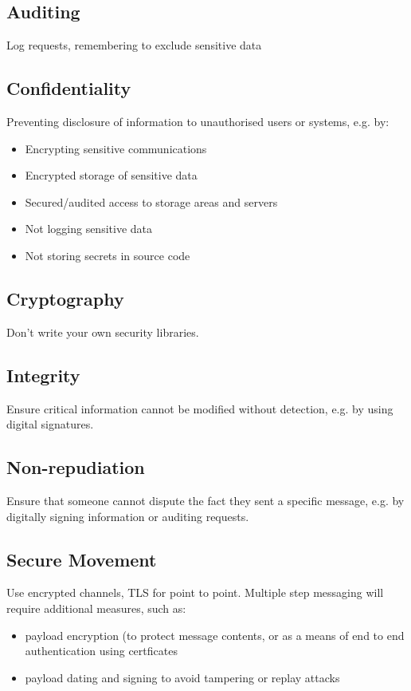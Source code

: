 \documentclass[a5paper,pagesize,10pt,bibtotoc,DIV=10,twoside]{scrbook}
\begin{document}
\subsection{Auditing}

Log requests, remembering to exclude sensitive data

\subsection{Confidentiality}
Preventing disclosure of information to unauthorised users or systems, e.g. by:
\begin{itemize}
\item Encrypting sensitive communications
\item Encrypted storage of sensitive data
\item Secured/audited access to storage areas and servers
\item Not logging sensitive data
\item Not storing secrets in source code
\end{itemize}

\subsection{Cryptography}
Don't write your own security libraries.

\subsection{Integrity}
Ensure critical information cannot be modified without detection, e.g. by using digital signatures.

\subsection{Non-repudiation}
Ensure that someone cannot dispute the fact they sent a specific message, e.g. by digitally signing information or auditing requests.

\subsection{Secure Movement}
Use encrypted channels, TLS for point to point. Multiple step messaging will require additional measures, such as:

\begin{itemize}
\item payload encryption (to protect message contents, or as a means of end to end authentication using certficates
\item payload dating and signing to avoid tampering or replay attacks
\end{itemize}
\end{document}
